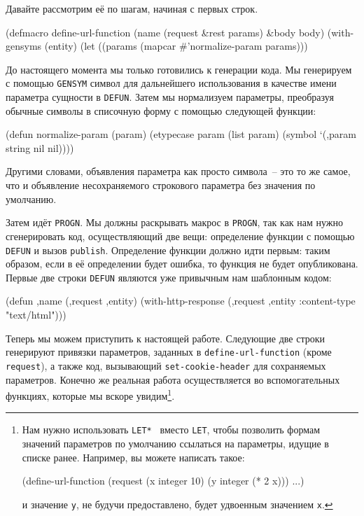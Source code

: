 Давайте рассмотрим её по шагам, начиная с первых строк.

\begin{myverb}
(defmacro define-url-function (name (request &rest params) &body body)
  (with-gensyms (entity)
    (let ((params (mapcar #'normalize-param params)))
\end{myverb}

До настоящего момента мы только готовились к генерации кода. Мы генерируем с помощью
\lstinline{GENSYM} символ для дальнейшего использования в качестве имени параметра сущности в
\lstinline{DEFUN}. Затем мы нормализуем параметры, преобразуя обычные символы в списочную
форму с помощью следующей функции:

\begin{myverb}
(defun normalize-param (param)
  (etypecase param
    (list param)
    (symbol `(,param string nil nil))))
\end{myverb}

Другими словами, объявления параметра как просто символа~-- это то же самое, что и
объявление несохраняемого строкового параметра без значения по умолчанию.

Затем идёт \lstinline{PROGN}. Мы должны раскрывать макрос в \lstinline{PROGN}, так как нам нужно
сгенерировать код, осуществляющий две вещи: определение функции с помощью \lstinline{DEFUN} и
вызов \lstinline{publish}. Определение функции должно идти первым: таким образом, если в её
определении будет ошибка, то функция не будет опубликована. Первые две строки
\lstinline{DEFUN} являются уже привычным нам шаблонным кодом:

\begin{myverb}
(defun ,name (,request ,entity)
  (with-http-response (,request ,entity :content-type "text/html")))
\end{myverb}

Теперь мы можем приступить к настоящей работе. Следующие две строки генерируют привязки
параметров, заданных в \lstinline{define-url-function} (кроме \lstinline{request}), а также код,
вызывающий \lstinline{set-cookie-header} для сохраняемых параметров. Конечно же реальная работа
осуществляется во вспомогательных функциях, которые мы вскоре увидим\footnote{Нам нужно
  использовать \lstinline{LET* } вместо \lstinline{LET}, чтобы позволить формам значений
  параметров по умолчанию ссылаться на параметры, идущие в списке ранее. Например, вы
  можете написать такое:

\begin{myverb}
(define-url-function (request (x integer 10) (y integer (* 2 x))) ...)
\end{myverb}

\noindent{}и значение \lstinline{y}, не будучи предоставлено, будет удвоенным значением \lstinline{x}.}.

